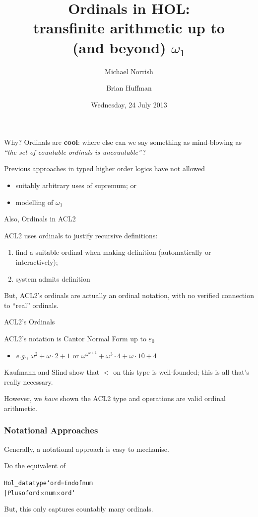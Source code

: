 \documentclass[xetex,14pt]{beamer}
\title{Ordinals in HOL:
\\transfinite arithmetic up to\\
(and beyond) $\omega_1$}
\author{Michael Norrish \and Brian Huffman}
\date{Wednesday, 24 July 2013}
\newenvironment{mytt}{\color{MyPurple}\fontsize{12}{12}\selectfont\begin{alltt}}{\end{alltt}}
\begin{document}
\begin{frame}
\maketitle
\end{frame}

\begin{frame}{Why?}
Ordinals are \textbf{cool}: where else can we say something as mind-blowing as \emph{“the set of countable ordinals is uncountable”}\,?

\bigskip
Previous approaches in typed higher order logics have not allowed
\begin{itemize}
\item suitably arbitrary uses of supremum; or
\item modelling of $\omega_1$
\end{itemize}
\end{frame}

\begin{frame}{Also, Ordinals in ACL2}

ACL2 uses ordinals to justify recursive definitions:
\begin{enumerate}
\item find a suitable ordinal when making definition (automatically or interactively);
\item system admits definition
\end{enumerate}

\bigskip But, ACL2’s ordinals are actually an ordinal notation, with no verified connection to “real” ordinals.
\end{frame}

\begin{frame}{ACL2’s Ordinals}

ACL2’s notation is Cantor Normal Form up to $\varepsilon_0$
\begin{itemize}
\item \emph{e.g.}, $\omega^2 + \omega\cdot 2 + 1$ or $\omega^{\omega^{\omega+1}} + \omega^3\cdot 4 + \omega \cdot 10 + 4$
\end{itemize}

\bigskip Kaufmann and Slind show that $<$ on this type is well-founded; this is all that’s really necessary.

\bigskip
However, we \emph{have} shown the ACL2 type and operations are valid ordinal arithmetic.

\end{frame}
\begin{frame}[fragile]
\frametitle{Notational Approaches}
Generally, a notational approach is easy to mechanise.

\bigskip
Do the equivalent of
\begin{mytt}
  Hol_datatype`ord = End of num
                   | Plus of ord \(\times\) num \(\times\) ord`
\end{mytt}

\bigskip
But, this only captures countably many ordinals.
\end{frame}
\end{document}
